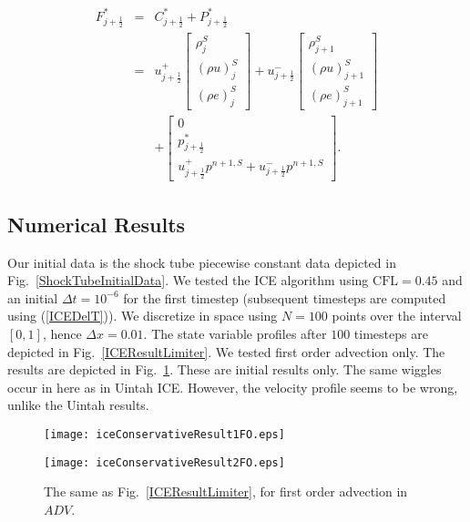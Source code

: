 \documentclass[11pt,oneside]{article}
\def \D {\Delta}
\def \cfl {\mathrm{CFL}}
\begin{document}
\begin{eqnarray}
\nonumber
F^*_{j+\frac12} & = & C^*_{j+\frac12} + P^*_{j+\frac12} \\
\nonumber
  & = &
  u^+_{j+\frac12}
  \left[
  \begin{array}{c}
  \rho_j^S \\
  (\rho u)_j^S \\
  (\rho e)_j^S
  \end{array}
  \right]
  +
  u^-_{j+\frac12}
  \left[
  \begin{array}{c}
  \rho_{j+1}^S \\
  (\rho u)_{j+1}^S \\
  (\rho e)_{j+1}^S
  \end{array}
  \right] \\
  && +
  \left[
  \begin{array}{c}
  0\\
  p^*_{j+\frac12} \\
  u^+_{j+\frac12} p^{n+1,S} + u^-_{j+\frac12} p^{n+1,S}
  \end{array}
  \right].
\end{eqnarray}

\subsection{Numerical Results}
Our initial data is the shock tube piecewise constant data depicted
in Fig.~\ref{ShockTubeInitialData}.
We tested the ICE algorithm using $\cfl = 0.45$ and
an initial $\D t = 10^{-6}$ for the first timestep (subsequent timesteps
are computed using (\ref{ICEDelT})). We discretize in space using $N = 100$
points over the interval $[0,1]$, hence $\D x = 0.01$.
The state variable profiles after $100$ timesteps are depicted in
Fig.~\ref{ICEResultLimiter}. We tested first order advection only.
The results are depicted in Fig.~\ref{ICEConservativeResultFO}.
These are initial results only. The same wiggles occur in here as in Uintah
ICE. However, the velocity profile seems to be wrong, unlike the Uintah
results.
\begin{figure}[htbp]
\begin{center}
\texttt{[image: iceConservativeResult1FO.eps]}
\end{center}
\begin{center}
\texttt{[image: iceConservativeResult2FO.eps]}
\end{center}
\caption{The same as Fig.~\ref{ICEResultLimiter}, for first order advection
in $ADV$.}
\label{ICEConservativeResultFO}
\end{figure}
\end{document}

